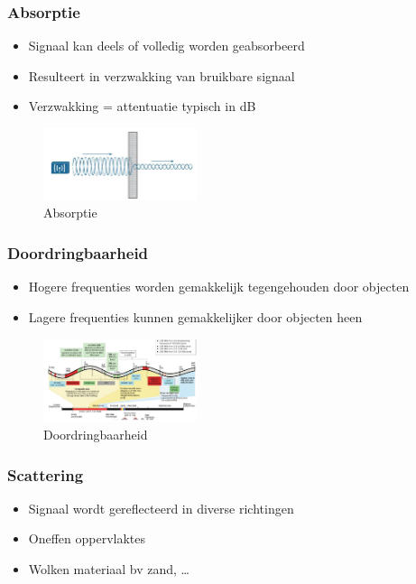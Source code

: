 \documentclass{article}
\begin{document}
\subsubsection{Absorptie}

\begin{itemize}
    \item Signaal kan deels of volledig worden geabsorbeerd 
    \item Resulteert in verzwakking van bruikbare signaal
    \item Verzwakking = attentuatie typisch in dB
\end{itemize}

\begin{figure}[H]
    \centering
    \includegraphics[width=0.4\textwidth]{Screenshot_20200309_124354.png}
    \caption{Absorptie}
\end{figure}

\subsubsection{Doordringbaarheid}
\begin{itemize}
    \item Hogere frequenties worden gemakkelijk tegengehouden door objecten
    \item Lagere frequenties kunnen gemakkelijker door objecten heen
\end{itemize}

\begin{figure}[H]
    \centering
    \includegraphics[width=0.4\textwidth]{Screenshot_20200309_124451.png}
    \caption{Doordringbaarheid}
\end{figure}

\subsubsection{Scattering}
\begin{itemize}
    \item Signaal wordt gereflecteerd in diverse richtingen
    \item Oneffen oppervlaktes
    \item Wolken materiaal bv zand, \dots
\end{itemize}
\end{document}
